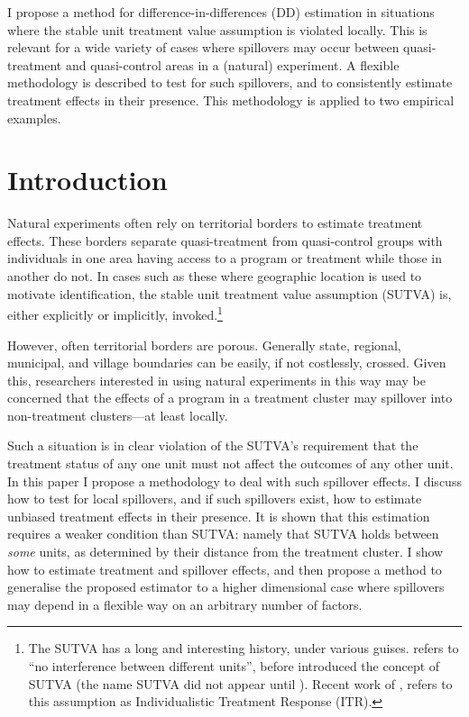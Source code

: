 \begin{chapabstract}
I propose a method for difference-in-differences (DD) estimation in situations 
where the stable unit treatment value assumption is violated locally. This is
relevant for a wide variety of cases where spillovers may occur between quasi-%
treatment and quasi-control areas in a (natural) experiment. A flexible 
methodology is described to test for such spillovers, and to consistently 
estimate treatment effects in their presence. This methodology is applied to two 
empirical examples.
\end{chapabstract}

\newpage
\section{Introduction}
Natural experiments often rely on territorial borders to estimate treatment 
effects.  These borders separate quasi-treatment from quasi-control groups with
individuals in one area having access to a program or treatment while those in 
another do not.  In cases such as these where geographic location is used to 
motivate identification, the stable unit treatment value assumption (SUTVA) is, 
either explicitly or implicitly, invoked.\footnote{The SUTVA has a long and 
interesting history, under various guises. \citet{Cox1958} refers to ``no 
interference between different units'', before \citet{Rubin1978} introduced the 
concept of SUTVA (the name SUTVA did not appear until \citet{Rubin1980}).  
Recent work of \citet{Manski2013}, refers to this assumption as Individualistic 
Treatment Response (ITR).}

However, often territorial borders are porous.  Generally state, regional,
municipal, and village boundaries can be easily, if not costlessly, crossed.
Given this, researchers interested in using natural experiments in this way may
be concerned that the effects of a program in a treatment cluster may spillover 
into non-treatment clusters---at least locally.

Such a situation is in clear violation of the SUTVA's requirement that the treatment
status of any one unit must not affect the outcomes of any other unit.  In this 
paper I propose a methodology to deal with such spillover effects.  I
discuss how to test for local spillovers, and if such spillovers exist, how to 
estimate unbiased treatment effects in their presence.  It is shown that this 
estimation requires a weaker condition than SUTVA: namely that SUTVA holds between 
\emph{some} units, as determined by their distance from the treatment cluster.  I 
show how to estimate treatment and spillover effects, and then
propose a method to generalise the proposed estimator to a higher dimensional 
case where spillovers may depend in a flexible way on an arbitrary number of 
factors.

